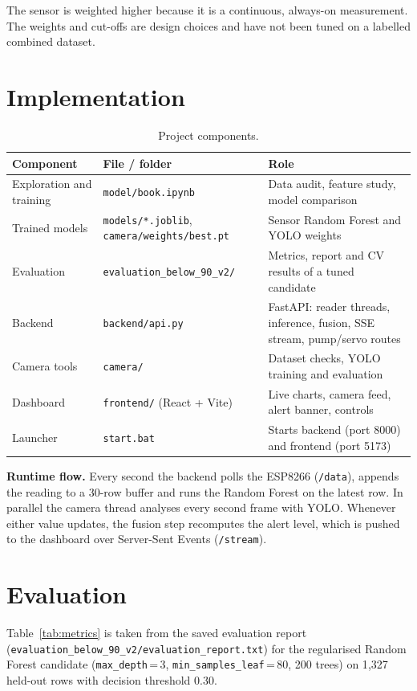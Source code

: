 \documentclass[12pt,a4paper]{article}
\begin{document}
The sensor is weighted higher because it is a continuous, always-on measurement. The weights and cut-offs are design choices and have not been tuned on a labelled combined dataset.

\section{Implementation}
\begin{table}[H]
\centering
\caption{Project components.}
\label{tab:impl}
\small
\begin{tabularx}{\textwidth}{l l X}
\toprule
\textbf{Component} & \textbf{File / folder} & \textbf{Role} \\
\midrule
Exploration and training & \texttt{model/book.ipynb} & Data audit, feature study, model comparison \\
Trained models  & \texttt{models/*.joblib}, \texttt{camera/weights/best.pt} & Sensor Random Forest and YOLO weights \\
Evaluation      & \texttt{evaluation\_below\_90\_v2/} & Metrics, report and CV results of a tuned candidate \\
Backend         & \texttt{backend/api.py} & FastAPI: reader threads, inference, fusion, SSE stream, pump/servo routes \\
Camera tools    & \texttt{camera/} & Dataset checks, YOLO training and evaluation \\
Dashboard       & \texttt{frontend/} (React + Vite) & Live charts, camera feed, alert banner, controls \\
Launcher        & \texttt{start.bat} & Starts backend (port 8000) and frontend (port 5173) \\
\bottomrule
\end{tabularx}
\end{table}

\textbf{Runtime flow.} Every second the backend polls the ESP8266 (\texttt{/data}), appends the reading to a 30-row buffer and runs the Random Forest on the latest row. In parallel the camera thread analyses every second frame with YOLO. Whenever either value updates, the fusion step recomputes the alert level, which is pushed to the dashboard over Server-Sent Events (\texttt{/stream}).

\section{Evaluation}
Table~\ref{tab:metrics} is taken from the saved evaluation report (\texttt{evaluation\_below\_90\_v2/evaluation\_report.txt}) for the regularised Random Forest candidate (\texttt{max\_depth}\,=\,3, \texttt{min\_samples\_leaf}\,=\,80, 200 trees) on 1{,}327 held-out rows with decision threshold 0.30.
\end{document}
